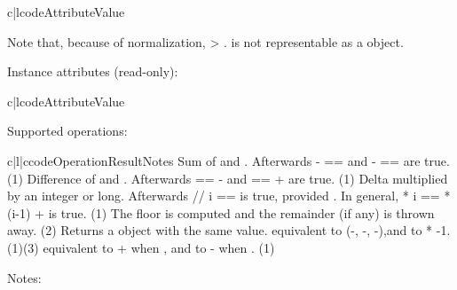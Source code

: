 \begin{tableii}{c|l}{code}{Attribute}{Value}
\end{tableii}

Note that, because of normalization,  \textgreater
{}.   is not representable as
a  object.

Instance attributes (read-only):

\begin{tableii}{c|l}{code}{Attribute}{Value}
\end{tableii}

Supported operations:

\begin{tableiii}{c|l|c}{code}{Operation}{Result}{Notes}
          {Sum of  and . 
           Afterwards - ==  and -
           ==  are true.}
          {(1)}
          {Difference of  and . Afterwards  ==
            -  and  ==  +  are
           true.}
          {(1)}
          {Delta multiplied by an integer or long.
           Afterwards  // i ==  is true, provided .
           In general,  * i ==  * (i-1) +  is true.}
          {(1)}
          {The floor is computed and the remainder (if any) is thrown away.}
          {(2)}
	  {Returns a  object with the same value.}
	  {}
	  {equivalent to (-, -,
	   -),and to * -1.}
	  {(1)(3)}	  
          {equivalent to + when , and to - when
           .}
          {(1)}

    
\end{tableiii}
\noindent
Notes:

